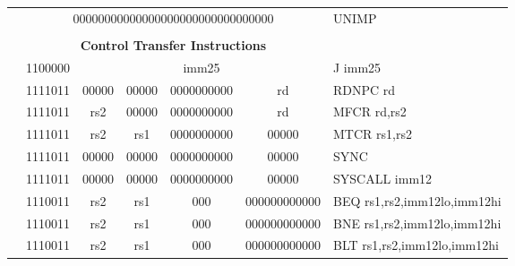 \begin{table}[p]
\begin{small}
\begin{center}
\begin{tabular}{rcccccccccccl}
&
\multicolumn{11}{|c|}{00000000000000000000000000000000} & UNIMP \\
\cline{2-12}
  

&
\multicolumn{11}{c}{} & \\
&
\multicolumn{11}{c}{\bf Control Transfer Instructions} & \\
\cline{2-12}
  

&
\multicolumn{1}{|c|}{1100000} &
\multicolumn{10}{c|}{imm25} & J imm25 \\
\cline{2-12}
  

&
\multicolumn{2}{|c|}{1111011} &
\multicolumn{1}{c|}{00000} &
\multicolumn{1}{c|}{00000} &
\multicolumn{6}{c|}{0000000000} &
\multicolumn{1}{c|}{rd} & RDNPC rd \\
\cline{2-12}
  

&
\multicolumn{2}{|c|}{1111011} &
\multicolumn{1}{c|}{rs2} &
\multicolumn{1}{c|}{00000} &
\multicolumn{6}{c|}{0000000000} &
\multicolumn{1}{c|}{rd} & MFCR rd,rs2 \\
\cline{2-12}
  

&
\multicolumn{2}{|c|}{1111011} &
\multicolumn{1}{c|}{rs2} &
\multicolumn{1}{c|}{rs1} &
\multicolumn{6}{c|}{0000000000} &
\multicolumn{1}{c|}{00000} & MTCR rs1,rs2 \\
\cline{2-12}
  

&
\multicolumn{2}{|c|}{1111011} &
\multicolumn{1}{c|}{00000} &
\multicolumn{1}{c|}{00000} &
\multicolumn{6}{c|}{0000000000} &
\multicolumn{1}{c|}{00000} & SYNC  \\
\cline{2-12}
  

&
\multicolumn{2}{|c|}{1111011} &
\multicolumn{1}{c|}{00000} &
\multicolumn{1}{c|}{00000} &
\multicolumn{6}{c|}{0000000000} &
\multicolumn{1}{c|}{00000} & SYSCALL imm12 \\
\cline{2-12}
  

&
\multicolumn{2}{|c|}{1110011} &
\multicolumn{1}{c|}{rs2} &
\multicolumn{1}{c|}{rs1} &
\multicolumn{2}{c|}{000} &
\multicolumn{5}{c|}{000000000000} & BEQ rs1,rs2,imm12lo,imm12hi \\
\cline{2-12}
  

&
\multicolumn{2}{|c|}{1110011} &
\multicolumn{1}{c|}{rs2} &
\multicolumn{1}{c|}{rs1} &
\multicolumn{2}{c|}{000} &
\multicolumn{5}{c|}{000000000000} & BNE rs1,rs2,imm12lo,imm12hi \\
\cline{2-12}
  

&
\multicolumn{2}{|c|}{1110011} &
\multicolumn{1}{c|}{rs2} &
\multicolumn{1}{c|}{rs1} &
\multicolumn{2}{c|}{000} &
\multicolumn{5}{c|}{000000000000} & BLT rs1,rs2,imm12lo,imm12hi \\
\cline{2-12}
  


\end{tabular}
\end{center}
\end{small}
\end{table}
